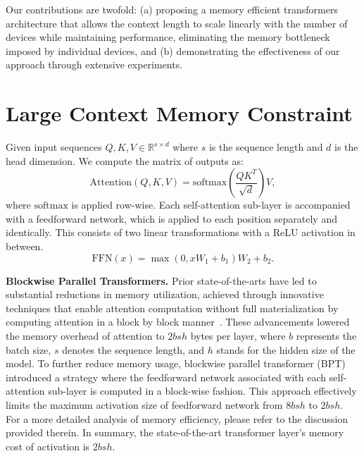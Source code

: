 \documentclass{article}
\begin{document}
Our contributions are twofold: (a) proposing a memory efficient transformers architecture that allows the context length to scale linearly with the number of devices while maintaining performance, eliminating the memory bottleneck imposed by individual devices, and (b) demonstrating the effectiveness of our approach through extensive experiments.


\section{Large Context Memory Constraint}
Given input sequences $Q, K, V \in \mathbb{R}^{s \times d}$ where $s$ is the sequence length and
$d$ is the head dimension.
We compute the matrix of outputs as:
\begin{equation*}
   \mathrm{Attention}(Q, K, V) = \mathrm{softmax}(\frac{QK^T}{\sqrt{d}})V,
\end{equation*}
where $\mathrm{softmax}$ is applied row-wise.
Each self-attention sub-layer is accompanied with a feedforward network, which is applied to each position separately and identically.
This consists of two linear transformations with a ReLU activation in between.
\begin{equation*}
   \mathrm{FFN}(x)=\max(0, xW_1 + b_1) W_2 + b_2.
\end{equation*}

\textbf{Blockwise Parallel Transformers.}
Prior state-of-the-arts have led to substantial reductions in memory utilization, achieved through innovative techniques that enable attention computation without full materialization by computing attention in a block by block manner~\citep{rabe2021self, dao2022flashattention, liu2023blockwise}.
These advancements lowered the memory overhead of attention to $2bsh$ bytes per layer, where $b$ represents the batch size, $s$ denotes the sequence length, and $h$ stands for the hidden size of the model.
To further reduce memory usage, blockwise parallel transformer (BPT)~\citep{liu2023blockwise} introduced a strategy where the feedforward network associated with each self-attention sub-layer is computed in a block-wise fashion.
This approach effectively limits the maximum activation size of feedforward network from $8bsh$ to $2bsh$.
For a more detailed analysis of memory efficiency, please refer to the discussion provided therein.
In summary, the state-of-the-art transformer layer's memory cost of activation is $2bsh$.
\end{document}
